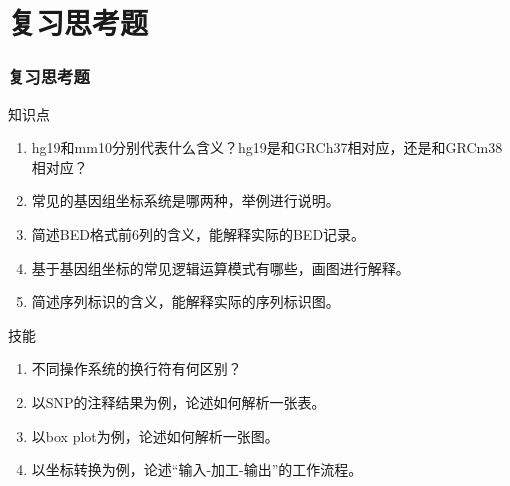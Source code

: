\section{复习思考题}
\begin{frame}
  \frametitle{复习思考题}
  \begin{block}{知识点}
    \begin{enumerate}
      \item hg19和mm10分别代表什么含义？hg19是和GRCh37相对应，还是和GRCm38相对应？
      \item 常见的基因组坐标系统是哪两种，举例进行说明。
      \item 简述BED格式前6列的含义，能解释实际的BED记录。
      \item 基于基因组坐标的常见逻辑运算模式有哪些，画图进行解释。
      \item 简述序列标识的含义，能解释实际的序列标识图。
    \end{enumerate}
  \end{block}
  \begin{block}{技能}
    \begin{enumerate}
      \item 不同操作系统的换行符有何区别？
      \item 以SNP的注释结果为例，论述如何解析一张表。
      \item 以box plot为例，论述如何解析一张图。
      \item 以坐标转换为例，论述“输入-加工-输出”的工作流程。
    \end{enumerate}
  \end{block}
\end{frame}
